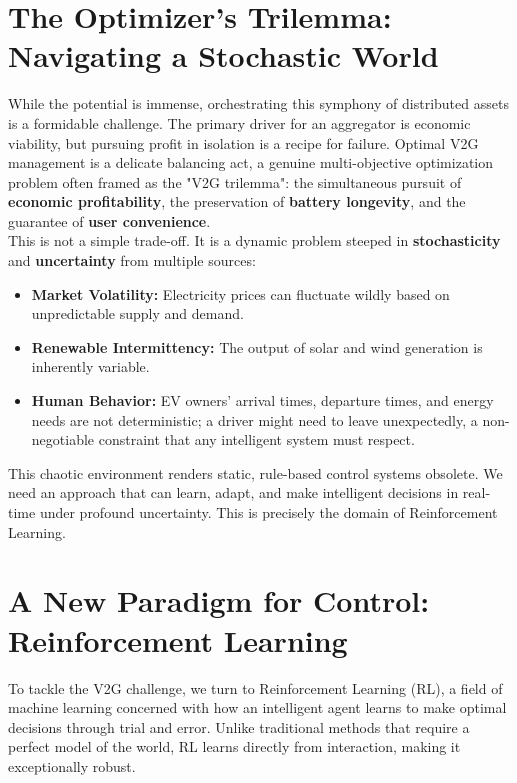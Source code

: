 \section{The Optimizer's Trilemma: Navigating a Stochastic World}
While the potential is immense, orchestrating this symphony of distributed assets is a formidable challenge. The primary driver for an aggregator is economic viability, but pursuing profit in isolation is a recipe for failure. Optimal V2G management is a delicate balancing act, a genuine multi-objective optimization problem often framed as the "V2G trilemma": the simultaneous pursuit of \textbf{economic profitability}, the preservation of \textbf{battery longevity}, and the guarantee of \textbf{user convenience}.
\\
\noindent
This is not a simple trade-off. It is a dynamic problem steeped in \textbf{stochasticity} and \textbf{uncertainty} from multiple sources:
\begin{itemize}
    \item \textbf{Market Volatility:} Electricity prices can fluctuate wildly based on unpredictable supply and demand.
    \item \textbf{Renewable Intermittency:} The output of solar and wind generation is inherently variable.
    \item \textbf{Human Behavior:} EV owners' arrival times, departure times, and energy needs are not deterministic; a driver might need to leave unexpectedly, a non-negotiable constraint that any intelligent system must respect.
\end{itemize}
This chaotic environment renders static, rule-based control systems obsolete. We need an approach that can learn, adapt, and make intelligent decisions in real-time under profound uncertainty. This is precisely the domain of Reinforcement Learning.

\section{A New Paradigm for Control: Reinforcement Learning}
To tackle the V2G challenge, we turn to Reinforcement Learning (RL), a field of machine learning concerned with how an intelligent agent learns to make optimal decisions through trial and error. Unlike traditional methods that require a perfect model of the world, RL learns directly from interaction, making it exceptionally robust.

